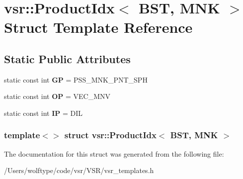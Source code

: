 \hypertarget{structvsr_1_1_product_idx_3_01_b_s_t_00_01_m_n_k_01_4}{\section{vsr\-:\-:Product\-Idx$<$ B\-S\-T, M\-N\-K $>$ Struct Template Reference}
\label{structvsr_1_1_product_idx_3_01_b_s_t_00_01_m_n_k_01_4}
}
\subsection*{Static Public Attributes}
\begin{DoxyCompactItemize}
\item 
\hypertarget{structvsr_1_1_product_idx_3_01_b_s_t_00_01_m_n_k_01_4_a8a7fd13e40e9762357f9aa84028d4264}{static const int {\bfseries G\-P} = P\-S\-S\-\_\-\-M\-N\-K\-\_\-\-P\-N\-T\-\_\-\-S\-P\-H}\label{structvsr_1_1_product_idx_3_01_b_s_t_00_01_m_n_k_01_4_a8a7fd13e40e9762357f9aa84028d4264}

\item 
\hypertarget{structvsr_1_1_product_idx_3_01_b_s_t_00_01_m_n_k_01_4_ab361ea5dd697a60b142ebde5b08f1471}{static const int {\bfseries O\-P} = V\-E\-C\-\_\-\-M\-N\-V}\label{structvsr_1_1_product_idx_3_01_b_s_t_00_01_m_n_k_01_4_ab361ea5dd697a60b142ebde5b08f1471}

\item 
\hypertarget{structvsr_1_1_product_idx_3_01_b_s_t_00_01_m_n_k_01_4_a42b685761aa1010766708aa1fd0d8e7d}{static const int {\bfseries I\-P} = D\-I\-L}\label{structvsr_1_1_product_idx_3_01_b_s_t_00_01_m_n_k_01_4_a42b685761aa1010766708aa1fd0d8e7d}

\end{DoxyCompactItemize}
\subsubsection*{template$<$$>$ struct vsr\-::\-Product\-Idx$<$ B\-S\-T, M\-N\-K $>$}



The documentation for this struct was generated from the following file\-:\begin{DoxyCompactItemize}
\item 
/\-Users/wolftype/code/vsr/\-V\-S\-R/vsr\-\_\-templates.\-h\end{DoxyCompactItemize}

